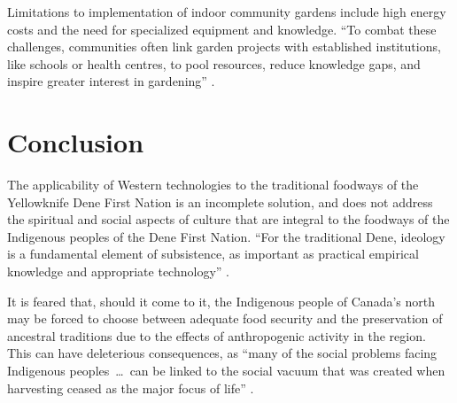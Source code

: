 \documentclass{report}
\begin{document}
\hspace{24pt} Limitations to implementation of indoor community gardens include high energy costs and the need for specialized equipment and knowledge. ``To combat these challenges, communities often link garden projects with established institutions, like schools or health centres, to pool resources, reduce knowledge gaps, and inspire greater interest in gardening'' \parencite[90]{resilientcommunities}.

\section{Conclusion}

\hspace{24pt} The applicability of Western technologies to the traditional foodways of the Yellowknife Dene First Nation is an incomplete solution, and does not address the spiritual and social aspects of culture that are integral to the foodways of the Indigenous peoples of the Dene First Nation.
``For the traditional Dene, ideology is a fundamental element of subsistence, as important as practical empirical knowledge and appropriate technology'' \parencite[64]{lorecapturingtraditional}.

\hspace{24pt}It is feared that, should it come to it, the Indigenous people of Canada's north may be forced to choose between adequate food security and the preservation of ancestral traditions due to the effects of anthropogenic activity in the region. 
This can have deleterious consequences, as ``many of the social problems facing Indigenous peoples~\ldots~can be linked to the social vacuum that was created when harvesting ceased as the major focus of life'' \parencite[269]{socialculturalcapital}.

\clearpage

\printbibliography
\end{document}

